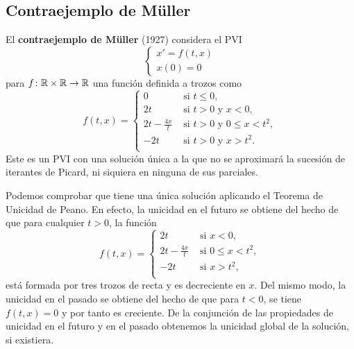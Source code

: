 \documentclass[11pt]{article}
\theoremstyle{plain}
\theoremstyle{definition}
\theoremstyle{remark}
\begin{document}
\subsection{Contraejemplo de Müller}

El \textbf{contraejemplo de Müller} (1927) considera el PVI
\[\left\{\begin{array}{l}
  x' = f(t,x) \\
  x(0) = 0
\end{array}\right.\]
para \(f \colon \mathbb{R} \times \mathbb{R} \to \mathbb{R}\) una función definida a trozos como
\[ f(t,x) = \left\{
    \begin{array}{ll}
      0 & \mbox{ si } t \leq 0, \\
      2t & \mbox{ si } t > 0 \mbox{ y } x < 0, \\
      2t - \frac{4x}{t} & \mbox{ si } t > 0 \mbox{ y } 0 \leq x < t^2, \\
      -2t & \mbox{ si } t > 0 \mbox{ y } x > t^2. \\
    \end{array}\right.\]
Este es un PVI con una solución única a la que no se aproximará
la sucesión de iterantes de Picard, ni siquiera en ninguna de sus
parciales.


\begin{figure}
\centering
{}
\end{figure}

Podemos comprobar que tiene una única solución aplicando el Teorema
de Unicidad de Peano. En efecto, la unicidad en el futuro se obtiene
del hecho de que para cualquier $t>0$, la función
\[ f(t,x) = \left\{
    \begin{array}{ll}
      2t & \mbox{ si } x < 0, \\
      2t - \frac{4x}{t} & \mbox{ si } 0 \leq x < t^2, \\
      -2t & \mbox{ si } x > t^2, \\
    \end{array}\right.\]
está formada por tres trozos de recta y es decreciente en $x$. Del
mismo modo, la unicidad en el pasado se obtiene del hecho de que
para $t < 0$, se tiene $f(t,x) = 0$ y por tanto es creciente. De
la conjunción de las propiedades de unicidad en el futuro y en el
pasado obtenemos la unicidad global de la solución, si existiera.
\end{document}
